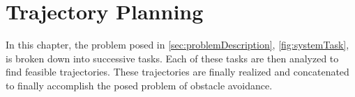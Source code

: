 \chapter{Trajectory Planning}
In this chapter, the problem posed in \autoref{sec:problemDescription}, \autoref{fig:systemTask}, is broken down into successive tasks. Each of these tasks are then analyzed to find feasible trajectories. These trajectories are finally realized and concatenated to finally accomplish the posed problem of obstacle avoidance.
